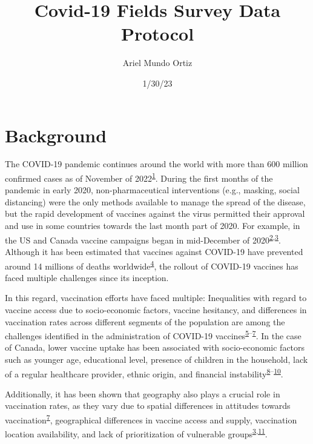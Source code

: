 \documentclass[
  letterpaper,
  DIV=11,
  numbers=noendperiod]{scrartcl}
\title{Covid-19 Fields Survey Data Protocol}
\author{Ariel Mundo Ortiz}
\date{1/30/23}
\begin{document}
\maketitle
\ifdefined\Shaded\renewenvironment{Shaded}{\begin{tcolorbox}[sharp corners, borderline west={3pt}{0pt}{shadecolor}, enhanced, breakable, boxrule=0pt, interior hidden, frame hidden]}{\end{tcolorbox}}\fi

\hypertarget{background}{%
\section{Background}\label{background}}

The COVID-19 pandemic continues around the world with more than 600
million confirmed cases as of November of
2022\textsuperscript{\protect\hyperlink{ref-WHO-Covid}{1}}. During the
first months of the pandemic in early 2020, non-pharmaceutical
interventions (e.g., masking, social distancing) were the only methods
available to manage the spread of the disease, but the rapid development
of vaccines against the virus permitted their approval and use in some
countries towards the last month part of 2020. For example, in the US
and Canada vaccine campaigns began in mid-December of
2020\textsuperscript{\protect\hyperlink{ref-tanne2020}{2},\protect\hyperlink{ref-bogoch2022}{3}}.
Although it has been estimated that vaccines against COVID-19 have
prevented around 14 millions of deaths
worldwide\textsuperscript{\protect\hyperlink{ref-watson2022}{4}}, the
rollout of COVID-19 vaccines has faced multiple challenges since its
inception.

In this regard, vaccination efforts have faced multiple: Inequalities
with regard to vaccine access due to socio-economic factors, vaccine
hesitancy, and differences in vaccination rates across different
segments of the population are among the challenges identified in the
administration of COVID-19
vaccines\textsuperscript{\protect\hyperlink{ref-gerretsen2021}{5}--\protect\hyperlink{ref-malik2020}{7}}.
In the case of Canada, lower vaccine uptake has been associated with
socio-economic factors such as younger age, educational level, presence
of children in the household, lack of a regular healthcare provider,
ethnic origin, and financial
instability\textsuperscript{\protect\hyperlink{ref-guay2022}{8}--\protect\hyperlink{ref-carter2022}{10}}.

Additionally, it has been shown that geography also plays a crucial role
in vaccination rates, as they vary due to spatial differences in
attitudes towards
vaccination\textsuperscript{\protect\hyperlink{ref-malik2020}{7}},
geographical differences in vaccine access and supply, vaccination
location availability, and lack of prioritization of vulnerable
groups\textsuperscript{\protect\hyperlink{ref-bogoch2022}{3},\protect\hyperlink{ref-nguyen2021}{11}}.
\end{document}
